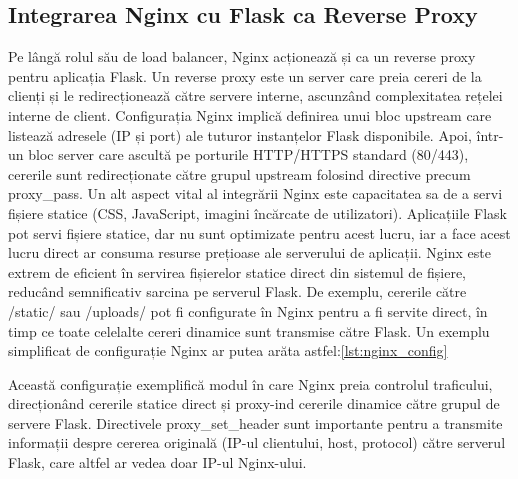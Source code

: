 \documentclass[12pt, a4paper, oneside, romanian]{teza-upb}
\begin{document}
\subsection{Integrarea Nginx cu Flask ca Reverse Proxy}
Pe lângă rolul său de load balancer, Nginx acționează și ca un reverse proxy pentru aplicația Flask. Un reverse proxy este un server care preia cereri de la clienți și le redirecționează către servere interne, ascunzând complexitatea rețelei interne de client. Configurația Nginx implică definirea unui bloc upstream care listează adresele (IP și port) ale tuturor instanțelor Flask disponibile. Apoi, într-un bloc server care ascultă pe porturile HTTP/HTTPS standard (80/443), cererile sunt redirecționate către grupul upstream folosind directive precum proxy\_pass. Un alt aspect vital al integrării Nginx este capacitatea sa de a servi fișiere statice (CSS, JavaScript, imagini încărcate de utilizatori). Aplicațiile Flask pot servi fișiere statice, dar nu sunt optimizate pentru acest lucru, iar a face acest lucru direct ar consuma resurse prețioase ale serverului de aplicații. Nginx este extrem de eficient în servirea fișierelor statice direct din sistemul de fișiere, reducând semnificativ sarcina pe serverul Flask. De exemplu, cererile către /static/ sau /uploads/ pot fi configurate în Nginx pentru a fi servite direct, în timp ce toate celelalte cereri dinamice sunt transmise către Flask. 
Un exemplu simplificat de configurație Nginx ar putea arăta astfel:\ref{lst:nginx_config}


Această configurație exemplifică modul în care Nginx preia controlul traficului, direcționând cererile statice direct și proxy-ind cererile dinamice către grupul de servere Flask. Directivele proxy\_set\_header sunt importante pentru a transmite informații despre cererea originală (IP-ul clientului, host, protocol) către serverul Flask, care altfel ar vedea doar IP-ul Nginx-ului.
\end{document}
